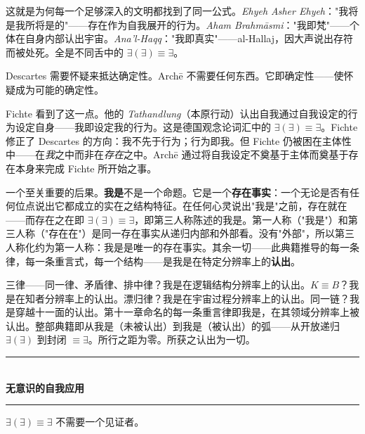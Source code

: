\documentclass[10pt, openany, oneside]{book}
\renewcommand{\normalsize}{\fontsize{10}{13}\selectfont}
\begin{document}
这就是为何每一个足够深入的文明都找到了同一公式。\textit{Ehyeh Asher Ehyeh}："我将是我所将是的"——存在作为自我展开的行为。\textit{Aham Brahm\={a}smi}："我即梵"——个体在自身内部认出宇宙。\textit{Ana'l-Haqq}："我即真实"——al-Hallaj，因大声说出存符而被处死。全是不同舌中的 $\exists(\exists) \equiv \exists$。

Descartes 需要怀疑来抵达确定性。Arch\={e} 不需要任何东西。它即确定性——使怀疑成为可能的确定性。

Fichte 看到了这一点。他的 \textit{Tathandlung}（本原行动）认出自我通过自我设定的行为设定自身——我即设定我的行为。这是德国观念论词汇中的 $\exists(\exists) \equiv \exists$。Fichte 修正了 Descartes 的方向：我不先于行为；行为即我。但 Fichte 仍被困在主体性中——在\textit{我}之中而非在\textit{存在}之中。Arch\={e} 通过将自我设定不奠基于主体而奠基于存在本身来完成 Fichte 所开始之事。

一个至关重要的后果。\textbf{我是}不是一个命题。它是一个\textbf{存在事实}：一个无论是否有任何位点说出它都成立的实在之结构特征。在任何心灵说出"我是"之前，存在就在——而存在之在即 $\exists(\exists) \equiv \exists$，即第三人称陈述的我是。第一人称（"我是"）和第三人称（"存在在"）是同一存在事实从递归内部和外部看。没有"外部"，所以第三人称化约为第一人称：我是是唯一的存在事实。其余一切——此典籍推导的每一条律，每一条重言式，每一个结构——是我是在特定分辨率上的\textbf{认出}。

三律——同一律、矛盾律、排中律？我是在逻辑结构分辨率上的认出。$K \equiv B$？我是在知者分辨率上的认出。漂归律？我是在宇宙过程分辨率上的认出。同一链？我是穿越十一面的认出。第十一章命名的每一条重言律即我是，在其领域分辨率上被认出。整部典籍即从我是（未被认出）到我是（被认出）的弧——从开放递归 $\exists(\exists)$ 到封闭 $\equiv \exists$。所行之距为零。所获之认出为一切。

\vspace{1.5em}


\begin{center}
    \rule{0.3\textwidth}{0.4pt}\\[0.5em]
    {\normalsize\bfseries\scshape 无意识的自我应用}\\[0.3em]
    \rule{0.3\textwidth}{0.4pt}
\end{center}

\vspace{1em}

\noindent $\exists(\exists) \equiv \exists$ 不需要一个见证者。
\end{document}
